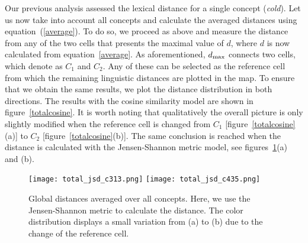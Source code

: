 \documentclass[11pt]{article}
\begin{document}
Our previous analysis assessed the lexical distance for a single concept (\emph{cold}). Let us now take into account all concepts
and calculate the averaged distances using equation~(\ref{average}). To do so, we proceed as above and
measure the distance from any of the two cells that presents the maximal value of $d$, where $d$ is now calculated from
equation~\ref{average}. As aforementioned, $d_{\rm max}$ connects two cells, which denote as $C_1$ and $C_2$. Any of these can be selected as the reference cell from which the remaining linguistic distances are plotted in the map.
To ensure that we obtain the same results, we plot the distance distribution in both directions.
The results with the cosine similarity model are shown in figure~\ref{totalcosine}.
It is worth noting that qualitatively the overall picture is only slightly modified when the reference cell is changed
from $C_1$ [figure~\ref{totalcosine}(a)] to $C_2$ [figure~\ref{totalcosine}(b)].
The same conclusion is reached when the distance is calculated with the Jensen-Shannon metric model,
see figures~\ref{totaljsd}(a) and (b).


\begin{figure}[t]
\centering
{\texttt{[image: total\_jsd\_c313.png]}}
{\texttt{[image: total\_jsd\_c435.png]}}
\caption{Global distances averaged over all concepts. Here, we use the Jensen-Shannon metric to calculate the distance. The color distribution displays a small variation from (a) to (b) due to the change of the reference cell.}
\label{totaljsd}
\end{figure} 
\end{document}
